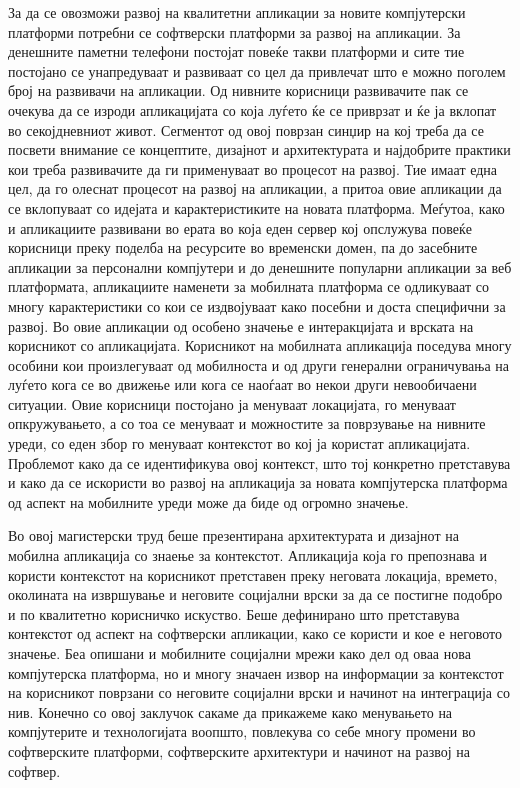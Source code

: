 За да се овозможи развој на квалитетни апликации за новите компјутерски
платформи потребни се софтверски платформи за развој на апликации. За денешните
паметни телефони постојат повеќе такви платформи и сите тие постојано се
унапредуваат и развиваат со цел да привлечат што е можно поголем број на
развивачи на апликации. Од нивните корисници развивачите пак се очекува да се
изроди апликацијата со која луѓето ќе се приврзат и ќе ја вклопат во
секојдневниот живот. Сегментот од овој поврзан синџир на кој треба да се посвети
внимание се концептите, дизајнот и архитектурата и најдобрите практики кои треба
развивачите да ги применуваат во процесот на развој. Тие имаат една цел, да го
олеснат процесот на развој на апликации, а притоа овие апликации да се
вклопуваат со идејата и карактеристиките на новата платформа. Меѓутоа, како и
апликациите развивани во ерата во која еден сервер кој опслужува повеќе
корисници преку поделба на ресурсите во временски домен, па до засебните
апликации за персонални компјутери и до денешните популарни апликации за веб
платформата, апликациите наменети за мобилната платформа се одликуваат со многу
карактеристики со кои се издвојуваат како посебни и доста специфични за развој.
Во овие апликации од особено значење е интеракцијата и врската на корисникот со
апликацијата. Корисникот на мобилната апликација поседува многу особини кои
произлегуваат од мобилноста и од други генерални ограничувања на луѓето кога се
во движење или кога се наоѓаат во некои други невообичаени ситуации. Овие
корисници постојано ја менуваат локацијата, го менуваат опкружувањето, а со тоа
се менуваат и можностите за поврзување на нивните уреди, со еден збор го
менуваат контекстот во кој ја користат апликацијата. Проблемот како да се
идентификува овој контекст, што тој конкретно претставува и како да се искористи
во развој на апликација за новата компјутерска платформа од аспект на мобилните
уреди може да биде од огромно значење.

Во овој магистерски труд  беше презентирана архитектурата и дизајнот на мобилна
апликација со знаење за контекстот. Апликација која го препознава и користи
контекстот на корисникот претставен преку неговата локација, времето, околината
на извршување и неговите социјални врски за да се постигне подобро и по
квалитетно корисничко искуство. Беше дефинирано што претставува контекстот од
аспект на софтверски апликации, како се користи и кое е неговото значење. Беа
опишани и мобилните социјални мрежи како дел од оваа нова компјутерска
платформа, но и многу значаен извор на информации за контекстот на корисникот
поврзани со неговите социјални врски и начинот на интеграција со нив. Конечно со
овој заклучок сакаме да прикажеме како менувањето на компјутерите и
технологијата воопшто, повлекува со себе многу промени во софтверските
платформи, софтверските архитектури и начинот на развој на софтвер.

